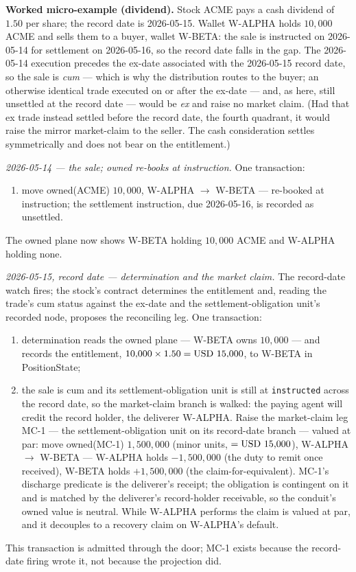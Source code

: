 \medskip\noindent\textbf{Worked micro-example (dividend).} Stock ACME pays a cash
dividend of $1.50$ per share; the record date is 2026-05-15. Wallet W-ALPHA holds
$10{,}000$ ACME and sells them to a buyer, wallet W-BETA: the sale is instructed on
2026-05-14 for settlement on 2026-05-16, so the record date falls in the gap. The
2026-05-14 execution precedes the ex-date associated with the 2026-05-15 record date,
so the sale is \emph{cum} --- which is why the distribution routes to the buyer; an
otherwise identical trade executed on or after the ex-date --- and, as here, still
unsettled at the record date --- would be \emph{ex} and raise no market claim. (Had that
ex trade instead settled before the record date, the fourth quadrant, it would raise the
mirror market-claim to the seller. The cash consideration settles symmetrically and does
not bear on the entitlement.)

\emph{2026-05-14 --- the sale; owned re-books at instruction.} One transaction:
\begin{enumerate}[label=(\arabic*),nosep]
\item move owned(ACME) $10{,}000$, W-ALPHA $\to$ W-BETA --- re-booked at
instruction; the settlement instruction, due 2026-05-16, is recorded as unsettled.
\end{enumerate}
The owned plane now shows W-BETA holding $10{,}000$ ACME and W-ALPHA holding none.

\emph{2026-05-15, record date --- determination and the market claim.} The
record-date watch fires; the stock's contract determines the entitlement and, reading
the trade's cum status against the ex-date and the settlement-obligation unit's recorded
node, proposes the reconciling leg. One transaction:
\begin{enumerate}[label=(\arabic*),nosep]
\item determination reads the owned plane --- W-BETA owns $10{,}000$ --- and records
the entitlement, $10{,}000 \times 1.50 = \mbox{USD~15{,}000}$, to W-BETA in PositionState;
\item the sale is cum and its settlement-obligation unit is still at \texttt{instructed}
across the record date, so the market-claim branch is walked: the paying agent will credit
the record holder, the deliverer W-ALPHA. Raise the market-claim leg MC-1 --- the
settlement-obligation unit on its record-date branch ---
valued at par: move owned(MC-1) $1{,}500{,}000$ (minor units, $=\mbox{USD~15{,}000}$),
W-ALPHA $\to$ W-BETA --- W-ALPHA holds $-1{,}500{,}000$ (the duty to remit once
received), W-BETA holds $+1{,}500{,}000$ (the claim-for-equivalent). MC-1's discharge
predicate is the deliverer's receipt; the obligation is contingent on it and is
matched by the deliverer's record-holder receivable, so the conduit's owned value is
neutral. While W-ALPHA performs the claim is valued at par, and it decouples to a
recovery claim on W-ALPHA's default.
\end{enumerate}
This transaction is admitted through the door; MC-1 exists because the record-date
firing wrote it, not because the projection did.

